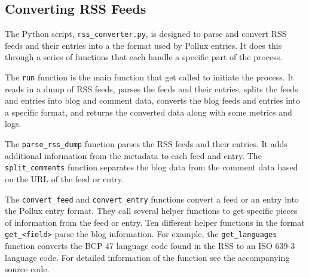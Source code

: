 \documentclass{article}
\begin{document}
\subsection{Converting RSS Feeds}

The Python script, \texttt{rss\_converter.py}, is designed to parse and convert RSS feeds and their entries into a the format used by Pollux entries. It does this through a series of functions that each handle a specific part of the process.

The \texttt{run} function is the main function that get called to initiate the process. It reads in a dump of RSS feeds, parses the feeds and their entries, splits the feeds and entries into blog and comment data, converts the blog feeds and entries into a specific format, and returns the converted data along with some metrics and logs.

The \texttt{parse\_rss\_dump} function parses the RSS feeds and their entries. It adds additional information from the metadata to each feed and entry.
The \texttt{split\_comments} function separates the blog data from the comment data based on the URL of the feed or entry.

The \texttt{convert\_feed} and \texttt{convert\_entry} functions convert a feed or an entry into the Pollux entry format. They call several helper functions to get specific pieces of information from the feed or entry.
Ten different helper functions in the format \texttt{get\_<field>} parse the  blog information. For example, the \texttt{get\_languages} function converts the BCP 47 language code found in the RSS to an ISO 639-3 language code. For detailed information of the function see the accompanying source code.

\end{document}
